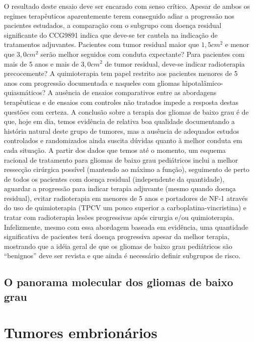 \documentclass[11pt,a4paper,oldfontcommands]{memoir}
\begin{document}
O resultado deste ensaio deve ser encarado com senso crítico. Apesar de ambos os regimes terapêuticos aparentemente terem conseguido adiar a progressão nos pacientes estudados, a comparação com o subgrupo com doença residual significante do CCG9891 indica que deve-se ter cautela na indicação de tratamentos adjuvantes. Pacientes com tumor residual maior que \(1,5 cm^2\) e menor que \(3,0 cm^2\) serão melhor seguidos com conduta expectante? Para pacientes com mais de 5 anos e mais de \(3,0 cm^2\) de tumor residual, deve-se indicar radioterapia precocemente? A quimioterapia tem papel restrito aos pacientes menores de 5 anos com progressão documentada e naqueles com gliomas hipotalâmico-quiasmáticos? A ausência de ensaios comparativos entre as abordagens terapêuticas e de ensaios com controles não tratados impede a resposta destas questões com certeza. A conclusão sobre a terapia dos gliomas de baixo grau é de que, hoje em dia, temos evidência de relativa boa qualidade documentando a história natural deste grupo de tumores, mas a ausência de adequados estudos controlados e randomizados ainda suscita dúvidas quanto à melhor conduta em cada situação. A partir dos dados que temos até o momento, um esquema racional de tratamento para gliomas de baixo grau pediátricos inclui a melhor ressecção cirúrgica possível (mantendo ao máximo a função), seguimento de perto de todos os pacientes com doença residual (independente da quantidade), aguardar a progressão para indicar terapia adjuvante (mesmo quando doença residual), evitar radioterapia em menores de 5 anos e portadores de NF-1 através do uso de quimioterapia (TPCV um pouco superior a carboplatina-vincristina) e tratar com radioterapia lesões progressivas após cirurgia e/ou quimioterapia. Infelizmente, mesmo com essa abordagem baseada em evidência, uma quantidade significativa de pacientes terá doença progressiva apesar da melhor terapia, mostrando que a idéia geral de que os gliomas de baixo grau pediátricos são “benignos” deve ser revista e que ainda é necessário definir subgrupos de risco.

\subsection{O panorama molecular dos gliomas de baixo grau}

\section{Tumores embrionários}
\end{document}
